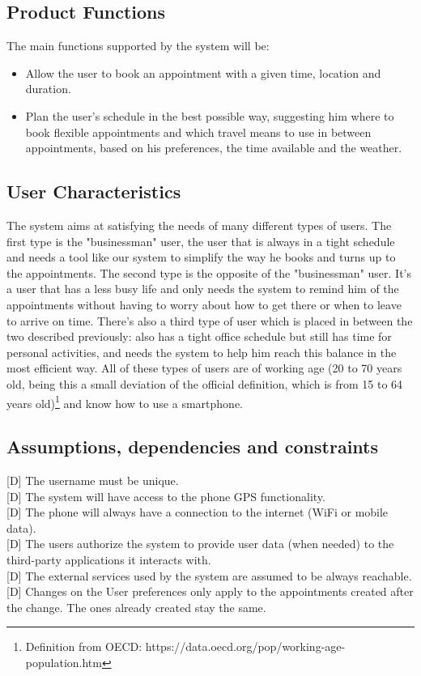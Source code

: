 \documentclass[12pt]{article}
\begin{document}
\subsection{Product Functions}
The main functions supported by the system will be:
\begin{itemize}
    \item Allow the user to book an appointment with a given time, location and duration.
    \item Plan the user's schedule in the best possible way, suggesting him where to book flexible appointments and which travel means to use in between appointments, based on his preferences, the time available and the weather.
\end{itemize}

\subsection{User Characteristics}
The system aims at satisfying the needs of many different types of users. The first type is the "businessman" user, the user that is always in a tight schedule and needs a tool like our system to simplify the way he books and turns up to the appointments. The second type is the opposite of the "businessman" user. It's a user that has a less busy life and only needs the system to remind him of the appointments without having to worry about how to get there or when to leave to arrive on time. There's also a third type of user which is placed in between the two described previously: also has a tight office schedule but still has time for personal activities, and needs the system to help him reach this balance in the most efficient way.
All of these types of users are of working age (20 to 70 years old, being this a small deviation of the official definition, which is from 15 to 64 years old)\footnote{Definition from OECD: https://data.oecd.org/pop/working-age-population.htm} and know how to use a smartphone.

\subsection{Assumptions, dependencies and constraints}
[D] The username must be unique.\\{}
[D] The system will have access to the phone GPS functionality.\\{}
[D] The phone will always have a connection to the internet (WiFi or mobile data).\\{}
[D] The users authorize the system to provide user data (when needed) to the third-party applications it interacts with.\\{}
[D] The external services used by the system are assumed to be always reachable.\\{}
[D] Changes on the User preferences only apply to the appointments created after the change. The ones already created stay the same.\\{}
\end{document}
